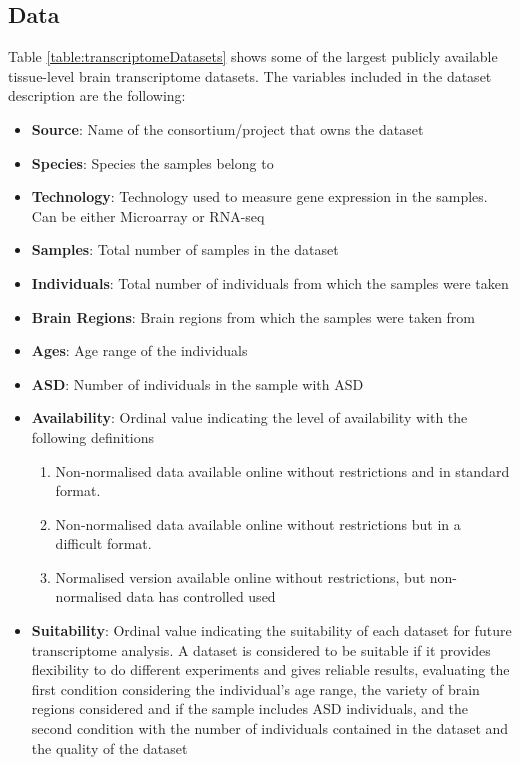 \subsection{Data}\label{Data}

Table \ref{table:transcriptomeDatasets} shows some of the largest publicly available tissue-level brain transcriptome datasets. The variables included in the dataset description are the following:

\begin{itemize}
    \item \textbf{Source}: Name of the consortium/project that owns the dataset

    \item \textbf{Species}: Species the samples belong to
    
    \item \textbf{Technology}: Technology used to measure gene expression in the samples. Can be either Microarray or RNA-seq
    
    \item \textbf{Samples}: Total number of samples in the dataset
    
    \item \textbf{Individuals}: Total number of individuals from which the samples were taken
    
    \item \textbf{Brain Regions}: Brain regions from which the samples were taken from
    
    \item \textbf{Ages}: Age range of the individuals
    
    \item \textbf{ASD}: Number of individuals in the sample with ASD
    
    \item \textbf{Availability}: Ordinal value indicating the level of availability with the following definitions
    \begin{enumerate}
        \item Non-normalised data available online without restrictions and in standard format.
        \item Non-normalised data available online without restrictions but in a difficult format.
        \item Normalised version available online without restrictions, but non-normalised data has controlled used
    \end{enumerate}
    
    \item \textbf{Suitability}: Ordinal value indicating the suitability of each dataset for future transcriptome analysis. A dataset is considered to be suitable if it provides flexibility to do different experiments and gives reliable results, evaluating the first condition considering the individual's age range, the variety of brain regions considered and if the sample includes ASD individuals, and the second condition with the number of individuals contained in the dataset and the quality of the dataset
\end{itemize}

